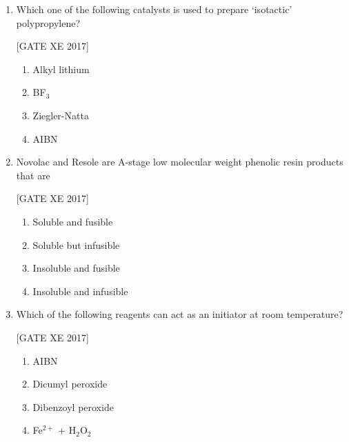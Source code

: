 \documentclass[journal,12pt,onecolumn]{IEEEtran}
\theoremstyle{remark}
\begin{document}
\begin{enumerate}
\hfill [GATE XE 2017]  

\begin{multicols}{2}  
\begin{enumerate}  
\item Carbon black  
\item Talc  
\item Glass beads  
\item Calcium carbonate  
\end{enumerate}  
\end{multicols}  

\item Which one of the following catalysts is used to prepare ‘isotactic’ polypropylene?  

\hfill [GATE XE 2017]  

\begin{multicols}{2}  
\begin{enumerate}  
\item Alkyl lithium  
\item BF$_3$  
\item Ziegler-Natta  
\item AIBN  
\end{enumerate}  
\end{multicols}  

\item Novolac and Resole are A-stage low molecular weight phenolic resin products that are  

\hfill [GATE XE 2017]  

\begin{multicols}{2}  
\begin{enumerate}  
\item Soluble and fusible  
\item Soluble but infusible  
\item Insoluble and fusible  
\item Insoluble and infusible  
\end{enumerate}  
\end{multicols}  

\item Which of the following reagents can act as an initiator at room temperature?  

\hfill [GATE XE 2017]  

\begin{multicols}{2}  
\begin{enumerate}  
\item AIBN  
\item Dicumyl peroxide  
\item Dibenzoyl peroxide  
\item Fe$^{2+}$ + H$_2$O$_2$  
\end{enumerate}  
\end{multicols}  


\end{enumerate}
\end{document}
